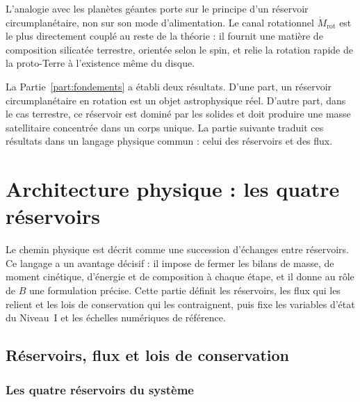 \documentclass[11pt,a4paper,openany]{report}
\begin{document}
\begin{lecture}
L'analogie avec les planètes géantes porte sur le principe d'un réservoir circumplanétaire, non
sur son mode d'alimentation. Le canal rotationnel $\dot M_{\mathrm{rot}}$ est le plus directement
couplé au reste de la théorie : il fournit une matière de composition silicatée terrestre, orientée
selon le spin, et relie la rotation rapide de la proto-Terre à l'existence même du disque.
\end{lecture}


\begin{rappel}
La Partie~\ref{part:fondements} a établi deux résultats. D'une part, un réservoir circumplanétaire
en rotation est un objet astrophysique réel. D'autre part, dans le cas terrestre, ce réservoir est
dominé par les solides et doit produire une masse satellitaire concentrée dans un corps unique.
La partie suivante traduit ces résultats dans un langage physique commun : celui des réservoirs et
des flux.
\end{rappel}
\part{Architecture physique : les quatre réservoirs}
\label{part:architecture}

\noindent
Le chemin physique est décrit comme une succession d'échanges entre réservoirs. Ce langage a
un avantage décisif : il impose de fermer les bilans de masse, de moment cinétique, d'énergie et
de composition à chaque étape, et il donne au rôle de $B$ une formulation précise. Cette partie
définit les réservoirs, les flux qui les relient et les lois de conservation qui les contraignent,
puis fixe les variables d'état du Niveau~I et les échelles numériques de référence.

\chapter{Réservoirs, flux et lois de conservation}
\label{ch:reservoirs}

\section{Les quatre réservoirs du système}
\end{document}
